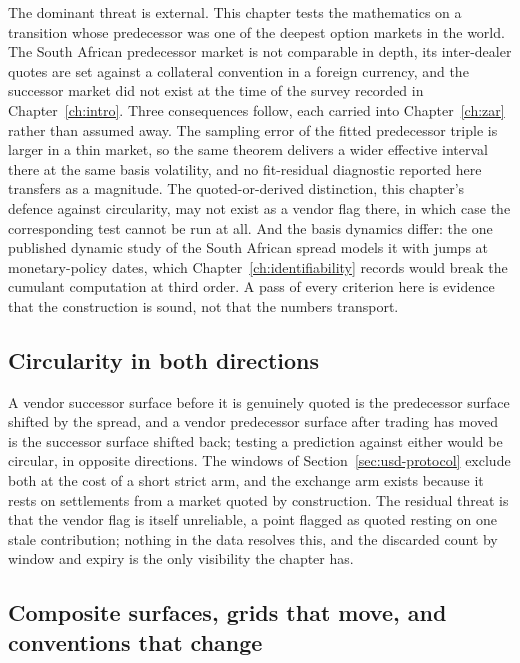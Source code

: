 \documentclass[../../../main.tex]{subfiles}
\begin{document}
The dominant threat is external. This chapter tests the mathematics on a transition whose predecessor was one of the deepest option markets in the world. The South African predecessor market is not comparable in depth, its inter-dealer quotes are set against a collateral convention in a foreign currency, and the successor market did not exist at the time of the survey recorded in Chapter~\ref{ch:intro}. Three consequences follow, each carried into Chapter~\ref{ch:zar} rather than assumed away. The sampling error of the fitted predecessor triple is larger in a thin market, so the same theorem delivers a wider effective interval there at the same basis volatility, and no fit-residual diagnostic reported here transfers as a magnitude. The quoted-or-derived distinction, this chapter's defence against circularity, may not exist as a vendor flag there, in which case the corresponding test cannot be run at all. And the basis dynamics differ: the one published dynamic study of the South African spread models it with jumps at monetary-policy dates, which Chapter~\ref{ch:identifiability} records would break the cumulant computation at third order. A pass of every criterion here is evidence that the construction is sound, not that the numbers transport.

\subsection{Circularity in both directions}

A vendor successor surface before it is genuinely quoted is the predecessor surface shifted by the spread, and a vendor predecessor surface after trading has moved is the successor surface shifted back; testing a prediction against either would be circular, in opposite directions. The windows of Section~\ref{sec:usd-protocol} exclude both at the cost of a short strict arm, and the exchange arm exists because it rests on settlements from a market quoted by construction. The residual threat is that the vendor flag is itself unreliable, a point flagged as quoted resting on one stale contribution; nothing in the data resolves this, and the discarded count by window and expiry is the only visibility the chapter has.

\subsection{Composite surfaces, grids that move, and conventions that change}
\end{document}
